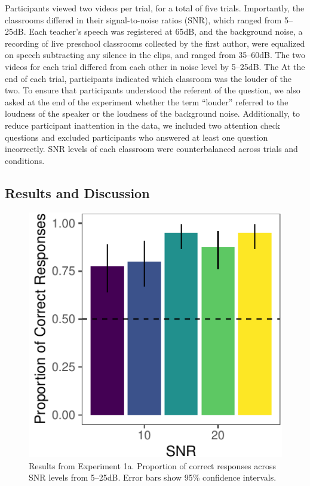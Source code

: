 \documentclass[10pt, letterpaper]{article}
\newenvironment{CodeChunk}{}{}
\begin{document}
Participants viewed two videos per trial, for a total of five trials.
Importantly, the classrooms differed in their signal-to-noise ratios
(SNR), which ranged from 5--25dB. Each teacher's speech was registered
at 65dB, and the background noise, a recording of live preschool
classrooms collected by the first author, were equalized on speech
subtracting any silence in the clips, and ranged from 35--60dB. The two
videos for each trial differed from each other in noise level by
5--25dB. The At the end of each trial, participants indicated which
classroom was the louder of the two. To ensure that participants
understood the referent of the question, we also asked at the end of the
experiment whether the term ``louder'' referred to the loudness of the
speaker or the loudness of the background noise. Additionally, to reduce
participant inattention in the data, we included two attention check
questions and excluded participants who answered at least one question
incorrectly. SNR levels of each classroom were counterbalanced across
trials and conditions.

\hypertarget{results-and-discussion}{%
\subsection{Results and Discussion}\label{results-and-discussion}}

\begin{CodeChunk}
\begin{figure}[t]

{\centering \includegraphics{figs/e1a-bar-1} 

}

\caption[Results from Experiment 1a]{Results from Experiment 1a. Proportion of correct responses across SNR levels from 5--25dB. Error bars show 95\% confidence intervals.}\label{fig:e1a-bar}
\end{figure}
\end{CodeChunk}
\end{document}
